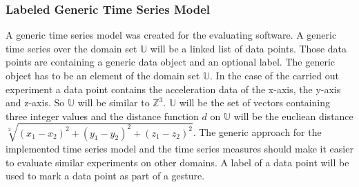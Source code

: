\subsubsection{Labeled Generic Time Series Model} \label{labeled_generic_time_series_model}
A generic time series model was created for the evaluating software. A generic time series over the domain set
$\mathbb{U}$ will be a linked list of data points. Those data points are containing a generic data object and an
optional label. The generic object has to be an element of the domain set $\mathbb{U}$. In the case of the carried out
experiment a data point contains the acceleration data of the x-axis, the y-axis and z-axis. So $\mathbb{U}$ will be
similar to $\mathbb{Z}^3$. $\mathbb{U}$ will be the set of vectors containing three integer values and the distance
function $d$ on $\mathbb{U}$ will be the eucliean distance $\sqrt[2]{(x_1 - x_2)^2 + (y_1 - y_2)^2 + (z_1 - z_2)^2}$.
The generic approach for the implemented time series model and the time series measures should make it easier to
evaluate similar experiments on other domains. A label of a data point will be used to mark a data point as part of a
gesture.
